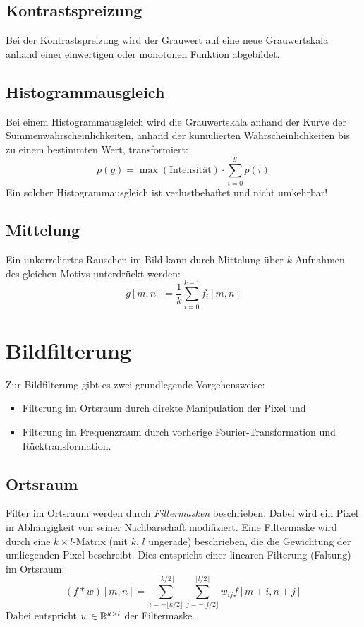 			\subsection{Kontrastspreizung}
				Bei der Kontrastspreizung wird der Grauwert auf eine neue Grauwertskala anhand einer einwertigen oder monotonen Funktion abgebildet.
			
			\subsection{Histogrammausgleich}
				Bei einem Histogrammausgleich wird die Grauwertskala anhand der Kurve der Summenwahrscheinlichkeiten, \dh anhand der kumulierten Wahrscheinlichkeiten bis zu einem bestimmten Wert, transformiert:
				\begin{equation*}
					p(g) = \max(\text{Intensität}) \cdot \sum_{i = 0}^{g} p(i)
				\end{equation*}
				Ein solcher Histogrammausgleich ist verlustbehaftet und nicht umkehrbar!
			
			\subsection{Mittelung}
				Ein unkorreliertes Rauschen im Bild kann durch Mittelung über \(k\) Aufnahmen des gleichen Motivs unterdrückt werden:
				\begin{equation*}
					g[m, n] = \frac{1}{k} \sum_{i = 0}^{k - 1} f_i[m, n]
				\end{equation*}

	\section{Bildfilterung}
		Zur Bildfilterung gibt es zwei grundlegende Vorgehensweise:
		\begin{itemize}
			\item Filterung im Ortsraum durch direkte Manipulation der Pixel und
			\item Filterung im Frequenzraum durch vorherige Fourier-Transformation und Rücktransformation.
		\end{itemize}

		\subsection{Ortsraum}
			Filter im Ortsraum werden durch \emph{Filtermasken} beschrieben. Dabei wird ein Pixel in Abhängigkeit von seiner Nachbarschaft modifiziert. Eine Filtermaske wird durch eine \( k \times l \)-Matrix (mit \(k\), \(l\) ungerade) beschrieben, die die Gewichtung der umliegenden Pixel beschreibt. Dies entspricht einer linearen Filterung (Faltung) im Ortsraum:
			\begin{equation*}
				(f \ast w)[m, n] = \sum_{i = -\lfloor k/2 \rfloor}^{\lfloor k/2 \rfloor} \sum_{j = -\lfloor l/2 \rfloor}^{\lfloor l/2 \rfloor} w_{ij} f[m + i, n + j]
			\end{equation*}
			Dabei entspricht \( w \in \mathbb{R}^{k \times l} \) der Filtermaske.

